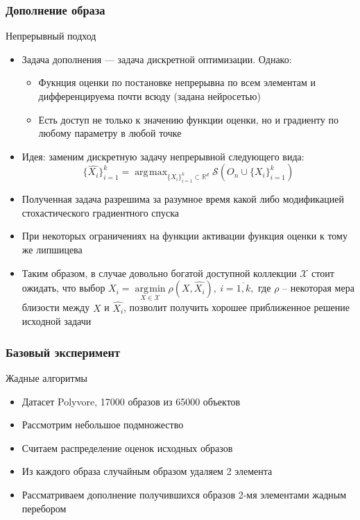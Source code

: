 \documentclass[10pt]{beamer}
\DeclareMathOperator*{\argmax}{\arg\!\max}
\DeclareMathOperator*{\argmin}{\arg\!\min}
\begin{document}
\begin{frame}
	\frametitle{Дополнение образа}
	\begin{block}{Непрерывный подход}
		\begin{itemize}
			\item Задача дополнения --- задача дискретной оптимизации. Однако:
				\begin{itemize}
					\item Фукнция оценки по постановке непрерывна по всем элементам и дифференцируема почти всюду (задана нейросетью)
					\item Есть доступ не только к значению функции оценки, но и градиенту по любому параметру в любой точке
				\end{itemize}
			\item Идея: заменим дискретную задачу непрерывной следующего вида:
			 	$$\{\hat{X_i}\}_{i=1}^k= \argmax_{\{X_i\}_{i=1}^k\subset\mathbb{R}^d} \mathcal{S}\left(O_n\cup\{X_i\}_{i=1}^k\right)$$
			 \item Полученная задача разрешима за разумное время какой либо модификацией стохастического градиентного спуска
			 \item При некоторых ограничениях на функции активации функция оценки к тому же липшицева
			 \item Таким образом, в случае довольно богатой доступной коллекции $\mathcal{X}$ стоит ожидать, что выбор 
			 $X_i = \argmin\limits_{X\in\mathcal{X}}\rho(X, \hat{X_i}),~i=\overline{1,k},$
			 где $\rho$ -- некоторая мера близости между $X$ и $\hat{X_i}$, позволит получить хорошее приближенное решение исходной задачи
		\end{itemize}
	\end{block}
\end{frame}


\begin{frame}
	\frametitle{Базовый эксперимент}
	\begin{block}{Жадные алгоритмы}
		\begin{itemize}
			\item Датасет Polyvore, 17000 образов из 65000 объектов
			\item Рассмотрим небольшое подмножество
			\item Считаем распределение оценок исходных образов
			\item Из каждого образа случайным образом удаляем 2 элемента 
			\item Рассматриваем дополнение получившихся образов 2-мя элементами жадным перебором			
		\end{itemize}
	\end{block}
\end{frame}
\end{document}

